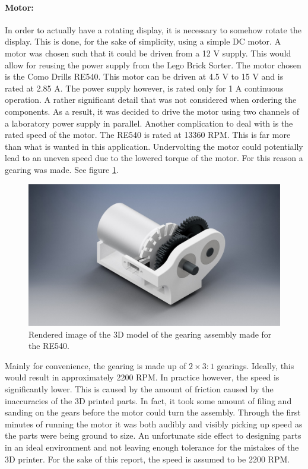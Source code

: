 \paragraph{Motor:}
In order to actually have a rotating display, it is necessary to somehow rotate the display.
This is done, for the sake of simplicity, using a simple DC motor.
A motor was chosen such that it could be driven from a 12 V supply.
This would allow for reusing the power supply from the Lego Brick Sorter.
The motor chosen is the Como Drills RE540.
This motor can be driven at 4.5 V to 15 V and is rated at 2.85 A.
The power supply however, is rated only for 1 A continuous operation.
A rather significant detail that was not considered when ordering the components.
As a result, it was decided to drive the motor using two channels of a laboratory power supply in parallel.
Another complication to deal with is the rated speed of the motor.
The RE540 is rated at 13360 RPM.
This is far more than what is wanted in this application.
Undervolting the motor could potentially lead to an uneven speed due to the lowered torque of the motor.
For this reason a gearing was made.
See figure \ref{fig:gearing}.
\begin{figure}[H]
	\centering
	\includegraphics[trim={10cm 0 10cm 0},clip,width=.6\linewidth]{images/gearing}
	\caption{Rendered image of the 3D model of the gearing assembly made for the RE540.}
	\label{fig:gearing}
\end{figure}
Mainly for convenience, the gearing is made up of $2\times3:1$ gearings.
Ideally, this would result in approximately 2200 RPM.
In practice however, the speed is significantly lower.
This is caused by the amount of friction caused by the inaccuracies of the 3D printed parts.
In fact, it took some amount of filing and sanding on the gears before the motor could turn the assembly.
Through the first minutes of running the motor it was both audibly and visibly picking up speed as the parts were being ground to size.
An unfortunate side effect to designing parts in an ideal environment and not leaving enough tolerance for the mistakes of the 3D printer.
For the sake of this report, the speed is assumed to be 2200 RPM.

